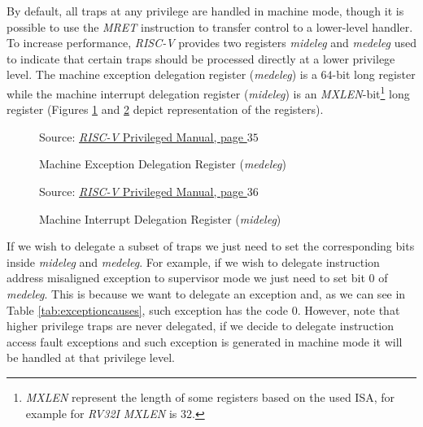 By default, all traps at any privilege are handled in machine mode, though it is
possible to use the \textit{MRET} instruction to transfer control to a lower-level
handler. To increase performance, \textit{RISC-V} provides two registers \textit{mideleg}
and \textit{medeleg} used to indicate that certain traps should be processed
directly at a lower privilege level. The machine exception delegation register (\textit{medeleg})
is a $64$-bit long register while the machine interrupt delegation register (\textit{mideleg})
is an \textit{MXLEN}-bit\footnote{\textit{MXLEN} represent the length of some registers
based on the used ISA, for example for \textit{RV32I} \textit{MXLEN} is $32$.} long
register (Figures \ref{fig:medeleg} and \ref{fig:mideleg} depict representation
of the registers). \\
\begin{figure}[H]
  \centering
  \def\stackalignment{r} %
  {\scriptsize Source: \href{https://drive.google.com/file/d/17GeetSnT5wW3xNuAHI95-SI1gPGd5sJ_/view}{\textit{RISC-V} Privileged Manual, page $35$}}
  \caption{Machine Exception Delegation Register (\textit{medeleg})}
  \label{fig:medeleg}
\end{figure}

\begin{figure}[H]
  \centering
  \def\stackalignment{r} %
  {\scriptsize Source: \href{https://drive.google.com/file/d/17GeetSnT5wW3xNuAHI95-SI1gPGd5sJ_/view}{\textit{RISC-V} Privileged Manual, page $36$}}
  \caption{Machine Interrupt Delegation Register (\textit{mideleg})}
  \label{fig:mideleg}
\end{figure}

If we wish to delegate a subset of traps we just need to set the corresponding
bits inside \textit{mideleg} and \textit{medeleg}. For example, if we wish to
delegate instruction address misaligned exception to supervisor mode we just
need to set bit $0$ of \textit{medeleg}. This is because we want to delegate an
exception and, as we can see in Table \ref{tab:exceptioncauses}, such exception
has the code $0$. However, note that higher privilege traps are never delegated,
if we decide to delegate instruction access fault exceptions and such exception is
generated in machine mode it will be handled at that privilege level.

